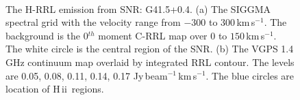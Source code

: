 \documentclass[manuscript]{aastex61}
\newcommand{\hii}{{\rm H\,}{{\sc ii}}}
\newcommand{\kms}{\,km\,s$^{-1}$}
\begin{document}
\begin{figure}[H]
\centering
{}
\\
\caption{The H-RRL emission from SNR: G41.5+0.4.
          (a) The SIGGMA spectral grid with the velocity range from $-300$ to $300$\kms.
	  The background is the 0$^{th}$ moment C-RRL map over $0$ to $150$\kms.
	  The white circle is the central region of the SNR.
	  (b) The VGPS 1.4 GHz continuum map overlaid by integrated RRL contour.
	  The levels are 0.05, 0.08, 0.11, 0.14, 0.17 Jy\,beam$^{-1}$\kms.
	  The blue circles are location of \hii\ regions.
	  }
\label{fig_snr-g415}
\end{figure}
\end{document}
